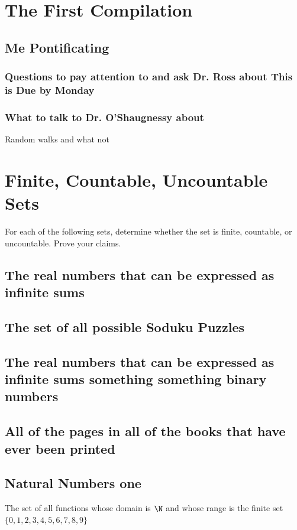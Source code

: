 \section{The First Compilation}

\subsection*{Me Pontificating}

\subsubsection*{Questions to pay attention to and ask Dr. Ross about This is Due by Monday}
\subsubsection*{What to talk to Dr. O'Shaugnessy about}
Random walks and what not 
\section{Finite, Countable, Uncountable Sets}
For each of the following sets, determine whether the set is finite, countable, or uncountable. Prove your claims. \\
\subsection{The real numbers that can be expressed as infinite sums}

\subsection{The set of all possible Soduku Puzzles}


\subsection{The real numbers that can be expressed as infinite sums something something binary numbers}


\subsection{All of the pages in all of the books that have ever been printed}

\subsection{Natural Numbers one}
The set of all functions whose domain is $\N$ and whose range is the finite set $\{0,1,2,3,4,5,6,7,8,9\}$

